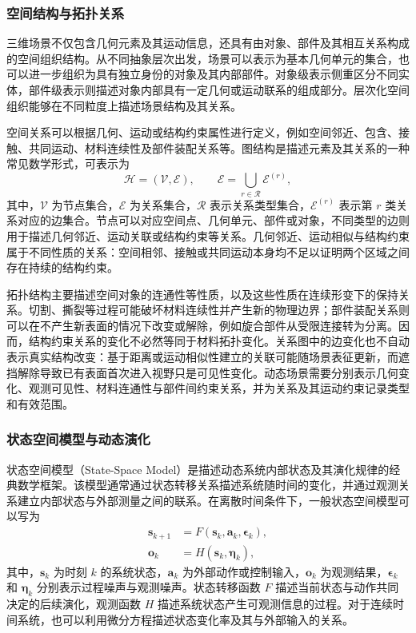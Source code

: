 \subsubsection{空间结构与拓扑关系}

三维场景不仅包含几何元素及其运动信息，还具有由对象、部件及其相互关系构成的空间组织结构。从不同抽象层次出发，场景可以表示为基本几何单元的集合，也可以进一步组织为具有独立身份的对象及其内部部件。对象级表示侧重区分不同实体，部件级表示则描述对象内部具有一定几何或运动联系的组成部分。层次化空间组织能够在不同粒度上描述场景结构及其关系。

空间关系可以根据几何、运动或结构约束属性进行定义，例如空间邻近、包含、接触、共同运动、材料连续性及部件装配关系等。图结构是描述元素及其关系的一种常见数学形式，可表示为
\[
  \mathcal{H}=(\mathcal{V},\mathcal{E}),
  \qquad
  \mathcal{E}=\bigcup_{r\in\mathcal{R}}\mathcal{E}^{(r)},
\]
其中，$\mathcal{V}$ 为节点集合，$\mathcal{E}$ 为关系集合，$\mathcal{R}$ 表示关系类型集合，$\mathcal{E}^{(r)}$ 表示第 $r$ 类关系对应的边集合。节点可以对应空间点、几何单元、部件或对象，不同类型的边则用于描述几何邻近、运动关联或结构约束等关系。几何邻近、运动相似与结构约束属于不同性质的关系：空间相邻、接触或共同运动本身均不足以证明两个区域之间存在持续的结构约束。

拓扑结构主要描述空间对象的连通性等性质，以及这些性质在连续形变下的保持关系。切割、撕裂等过程可能破坏材料连续性并产生新的物理边界；部件装配关系则可以在不产生新表面的情况下改变或解除，例如旋合部件从受限连接转为分离。因而，结构约束关系的变化不必然等同于材料拓扑变化。关系图中的边变化也不自动表示真实结构改变：基于距离或运动相似性建立的关联可能随场景表征更新，而遮挡解除导致已有表面首次进入视野只是可见性变化。动态场景需要分别表示几何变化、观测可见性、材料连通性与部件间约束关系，并为关系及其运动约束记录类型和有效范围。



\subsubsection{状态空间模型与动态演化}

状态空间模型（State-Space Model）是描述动态系统内部状态及其演化规律的经典数学框架。该模型通常通过状态转移关系描述系统随时间的变化，并通过观测关系建立内部状态与外部测量之间的联系。在离散时间条件下，一般状态空间模型可以写为
\begin{equation}
\begin{aligned}
  \mathbf{s}_{k+1} &= F(\mathbf{s}_k,\mathbf{a}_k,\boldsymbol{\epsilon}_k),\\
  \mathbf{o}_k &= H(\mathbf{s}_k,\boldsymbol{\eta}_k),
\end{aligned}
\label{eq:plan-state-space}
\end{equation}
其中，$\mathbf{s}_k$ 为时刻 $k$ 的系统状态，$\mathbf{a}_k$ 为外部动作或控制输入，$\mathbf{o}_k$ 为观测结果，$\boldsymbol{\epsilon}_k$ 和 $\boldsymbol{\eta}_k$ 分别表示过程噪声与观测噪声。状态转移函数 $F$ 描述当前状态与动作共同决定的后续演化，观测函数 $H$ 描述系统状态产生可观测信息的过程。对于连续时间系统，也可以利用微分方程描述状态变化率及其与外部输入的关系。

